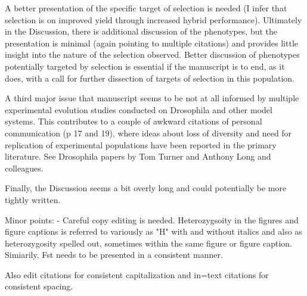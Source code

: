 \documentclass[onecolumn,oneside,letterpaper]{article}
\newcommand{\jri}[1]{\textcolor{red}{ \emph{\scriptsize  #1}} }
\begin{document}
\response{\jri{Justin? Jode?}}

A better presentation of the specific target of selection is needed (I infer that selection is on 
improved yield through increased hybrid performance). Ultimately in the Discussion, there is additional 
discussion of the phenotypes, but the presentation is minimal (again pointing to multiple citations) and 
provides little insight into the nature of the selection observed. Better discussion of phenotypes potentially 
targeted by selection is essential if the manuscript is to end, as it does, with a call for further dissection of 
targets of selection in this population.

\response{\jri{Jode? Justin?}}

A third major issue that manuscript seems to be not at all informed by multiple experimental evolution 
studies conducted on Drosophila and other model systems. This contributes to a couple of awkward 
citations of personal communication (p 17 and 19), where ideas about loss of diversity and need for 
replication of experimental populations have been reported in the primary literature. See Drosophila papers 
by Tom Turner and Anthony Long and colleagues.


Finally, the Discussion seems a bit overly long and could potentially be more tightly written.


Minor points: 
- Careful copy editing is needed. Heterozygsoity in the figures and figure captions is referred to variously 
as "H" with and without italics and also as heterozygosity spelled out, sometimes within the same figure or 
figure caption. Simiarily, Fst needs to be presented in a consistent manner. 


Also edit citations for consistent capitalization and in=text citations for consistent spacing. 

\end{document}
